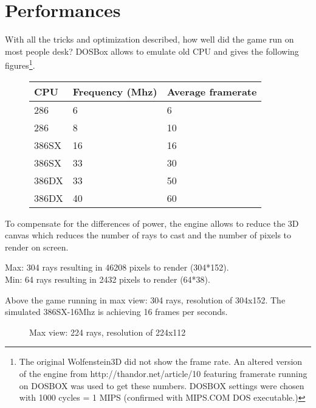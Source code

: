 \section{Performances}
With all the tricks and optimization described, how well did the game run on most people desk? DOSBox allows to emulate old CPU and gives the following figures\footnote{The original Wolfenstein3D did not show the frame rate. An altered version of the engine from http://thandor.net/article/10 featuring framerate running on DOSBOX was used to get these numbers. DOSBOX settings were chosen with 1000 cycles = 1 MIPS (confirmed with MIPS.COM DOS executable.)}.

\begin{figure}[H]
\centering
\begin{tabularx}{\textwidth}{ X X X }
  \toprule
  \textbf{CPU} & \textbf{Frequency (Mhz)} & \textbf{Average framerate} \\ \bottomrule
 286 & 6 & 6 \\
 286 & 8 & 10 \\
 386SX & 16 &  16 \\
 386SX & 33 & 30 \\
 386DX & 33 & 50 \\
 386DX & 40 & 60 \\ \bottomrule
\end{tabularx}
\end{figure}

To compensate for the differences of power, the engine allows to reduce the 3D canvas which reduces the number of rays to cast and the number of pixels to render on screen.
\par
Max: 304 rays resulting in 46208 pixels to render (304*152).\\
Min:  64 rays resulting in 2432 pixels to render (64*38).\\

  \begin{figure}[H]
\centering
 \end{figure}
 \par
 Above the game running in max view: 304 rays, resolution of 304x152. The simulated 386SX-16Mhz is achieving 16 frames per seconds.

   \begin{figure}[H]
\centering
 \caption{Max view: 224 rays, resolution of 224x112}
 \end{figure}
 \par

